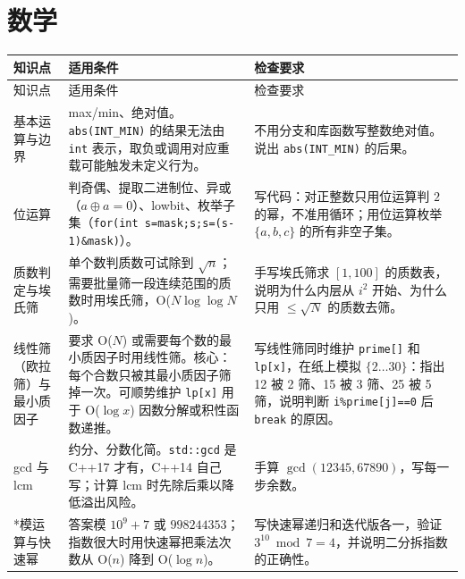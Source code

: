 \documentclass[a4paper,11pt]{article}
\newcommand{\code}[1]{\texttt{#1}}
\renewcommand{\arraystretch}{1.12}
\begin{document}
\newpage
\section{数学}

\begingroup
\small
\renewcommand{\arraystretch}{1.04}
\begin{longtable}{L{2.4cm} L{7.5cm} L{6.8cm}}
\toprule
知识点 & 适用条件 & 检查要求 \\
\midrule
\endfirsthead
\toprule
知识点 & 适用条件 & 检查要求 \\
\midrule
\endhead
\endfoot
\bottomrule
\endlastfoot

基本运算与边界
& max/min、绝对值。\code{abs(INT\_MIN)} 的结果无法由 \code{int} 表示，取负或调用对应重载可能触发未定义行为。
& 不用分支和库函数写整数绝对值。说出 \code{abs(INT\_MIN)} 的后果。 \\[2mm]

位运算
& 判奇偶、提取二进制位、异或（$a\oplus a=0$）、lowbit、枚举子集（\code{for(int s=mask;s;s=(s-1)\&mask)}）。
& 写代码：对正整数只用位运算判 $2$ 的幂，不准用循环；用位运算枚举 $\{a,b,c\}$ 的所有非空子集。 \\[2mm]

质数判定与埃氏筛
& 单个数判质数可试除到 $\sqrt{n}$；需要批量筛一段连续范围的质数时用埃氏筛，O($N\log\log N$)。
& 手写埃氏筛求 $[1,100]$ 的质数表，说明为什么内层从 $i^2$ 开始、为什么只用 $\le\sqrt{N}$ 的质数去筛。 \\[2mm]

线性筛（欧拉筛）与最小质因子
& 要求 O($N$) 或需要每个数的最小质因子时用线性筛。核心：每个合数只被其最小质因子筛掉一次。可顺势维护 \code{lp[x]} 用于 O($\log x$) 因数分解或积性函数递推。
& 写线性筛同时维护 \code{prime[]} 和 \code{lp[x]}，在纸上模拟 $\{2\ldots30\}$：指出 12 被 2 筛、15 被 3 筛、25 被 5 筛，说明判断 \code{i\%prime[j]==0} 后 \code{break} 的原因。 \\[2mm]

gcd 与 lcm
& 约分、分数化简。\code{std::gcd} 是 C++17 才有，C++14 自己写；计算 lcm 时先除后乘以降低溢出风险。
& 手算 $\gcd(12345,67890)$，写每一步余数。 \\[2mm]

*模运算与快速幂
& 答案模 $10^9+7$ 或 $998244353$；指数很大时用快速幂把乘法次数从 O($n$) 降到 O($\log n$)。
& 写快速幂递归和迭代版各一，验证 $3^{10}\bmod 7 = 4$，并说明二分拆指数的正确性。 \\[2mm]


\end{longtable}
\end{document}
